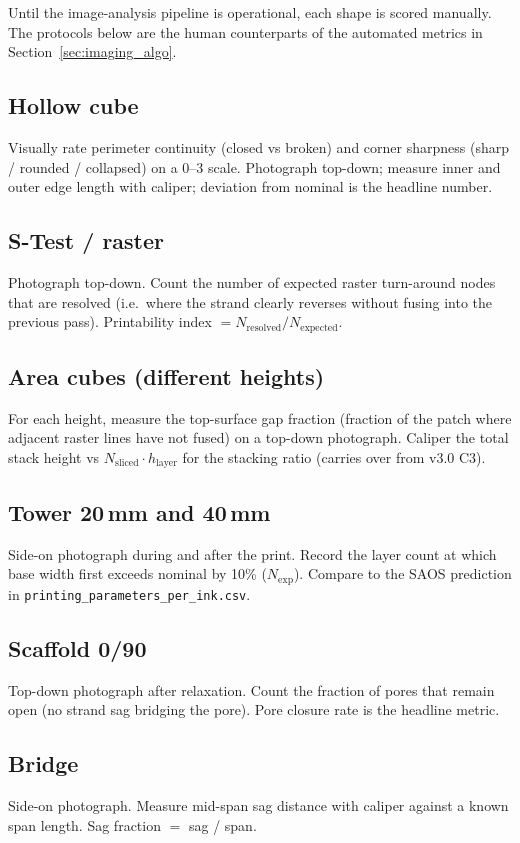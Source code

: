 \documentclass[11pt,a4paper]{article}
\begin{document}
Until the image-analysis pipeline is operational, each shape is
scored manually. The protocols below are the human counterparts
of the automated metrics in Section~\ref{sec:imaging_algo}.

\subsection{Hollow cube}
Visually rate perimeter continuity (closed vs broken) and
corner sharpness (sharp / rounded / collapsed) on a 0--3 scale.
Photograph top-down; measure inner and outer edge length with
caliper; deviation from nominal is the headline number.

\subsection{S-Test / raster}
Photograph top-down. Count the number of expected raster
turn-around nodes that are resolved (i.e.\ where the strand
clearly reverses without fusing into the previous pass).
Printability index $= N_\mathrm{resolved} / N_\mathrm{expected}$.

\subsection{Area cubes (different heights)}
For each height, measure the top-surface gap fraction
(fraction of the patch where adjacent raster lines have not
fused) on a top-down photograph. Caliper the total stack
height vs $N_\mathrm{sliced} \cdot h_\mathrm{layer}$ for the
stacking ratio (carries over from v3.0 C3).

\subsection{Tower 20\,mm and 40\,mm}
Side-on photograph during and after the print. Record the
layer count at which base width first exceeds nominal by 10\%
($N_\mathrm{exp}$). Compare to the SAOS prediction in
\texttt{printing\_parameters\_per\_ink.csv}.

\subsection{Scaffold 0/90}
Top-down photograph after relaxation. Count the fraction of
pores that remain open (no strand sag bridging the pore). Pore
closure rate is the headline metric.

\subsection{Bridge}
Side-on photograph. Measure mid-span sag distance with caliper
against a known span length. Sag fraction $=$ sag / span.
\end{document}

